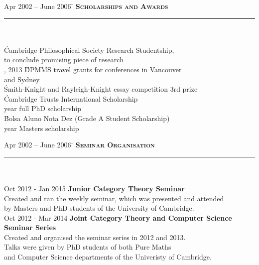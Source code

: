 \documentclass[11pt,a4paper]{article}
\begin{document}
\begin{tabbing} 
 Apr 2002 -- June 2006 \=\kill
\> \textbf{\Large{\textsc{Scholarships and Awards}}} \\
\> \noindent\rule{11cm}{1pt}\\
\> \\
 \' Cambridge Philosophical Society Research Studentship, \\ \> to conclude promising piece of research \\ [1mm]
, 2013 \' DPMMS travel grants for conferences in Vancouver \\ \>  and Sydney \\ [1mm]
 \' Smith-Knight and Rayleigh-Knight essay competition 3rd prize \\ [1mm]
 \' Cambridge Trusts International Scholarship \\  year full PhD scholarship \\ [1mm]
 \' Bolsa Aluno Nota Dez (Grade A Student Scholarship) \\  year Masters scholarship \\
\end{tabbing}
 







\begin{tabbing}
Apr 2002 -- June 2006 \=\kill
\> \textbf{\Large{\textsc{Seminar Organisation}}} \\
\> \noindent\rule{11cm}{1pt}\\
\> \\
\> Oct 2012 - Jan 2015 \' \textbf{Junior Category Theory Seminar} \\
\> Created and ran the weekly seminar, which was presented and attended  \\ \> by Masters and PhD students of the University of Cambridge.\\ [2mm] 
\> Oct 2012 - Mar 2014 \' \textbf{Joint Category Theory and Computer Science Seminar Series}\\ 
\> Created and organised the seminar series in 2012 and 2013. \\ 
\> Talks were given by PhD students of both Pure Maths \\ \> and Computer Science departments of the Univeristy of Cambridge.\\  
\end{tabbing}
\end{document}
